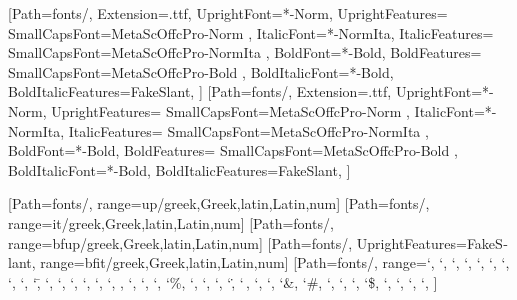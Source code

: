 
\usepackage[mathrm=sym, mathit=sym, mathsf=sym, mathbf=sym]{unicode-math}
\setmainfont{MetaOffcPro}[Path=fonts/,
	Extension=.ttf,
	UprightFont=*-Norm,
	UprightFeatures={
		SmallCapsFont={MetaScOffcPro-Norm}
	},
	ItalicFont=*-NormIta,
	ItalicFeatures={
		SmallCapsFont={MetaScOffcPro-NormIta}
	},
	BoldFont=*-Bold,
	BoldFeatures={
		SmallCapsFont={MetaScOffcPro-Bold}
	},
	BoldItalicFont=*-Bold,
	BoldItalicFeatures={FakeSlant},
]
\setsansfont{MetaOffcPro}[Path=fonts/,
	Extension=.ttf,
	UprightFont=*-Norm,
	UprightFeatures={
		SmallCapsFont={MetaScOffcPro-Norm}
	},
	ItalicFont=*-NormIta,
	ItalicFeatures={
		SmallCapsFont={MetaScOffcPro-NormIta}
	},
	BoldFont=*-Bold,
	BoldFeatures={
		SmallCapsFont={MetaScOffcPro-Bold}
	},
	BoldItalicFont=*-Bold,
	BoldItalicFeatures={FakeSlant},
]

[Path=fonts/,
	range=up/{greek,Greek,latin,Latin,num}]
[Path=fonts/,
	range=it/{greek,Greek,latin,Latin,num}]
[Path=fonts/,
	range=bfup/{greek,Greek,latin,Latin,num}]
[Path=fonts/, UprightFeatures={FakeSlant},
	range=bfit/{greek,Greek,latin,Latin,num}]
[Path=fonts/,
	range={`\+, `\-, `\×, `\÷, `\⋅, `\*, `\/, `\⁄, `\±,
		`\=, `\≠, `\≈, `\<, `\>, `\≤, `\≥, \partial, `\∞, `\†, `\‡,
		`\%, `\‰, `\!, `\?, `\., `\,, `\:, `\;, `\&, `\#, `\@,
		`\§, `\€, `\$, `\£, `\¥, `\©, `\®,
	}
]

\usepackage{polyglossia}
\setmainlanguage{german}

\usepackage[pantone312]{wwustyle-mod}
\usepackage{selnolig}
\usepackage{microtype}

